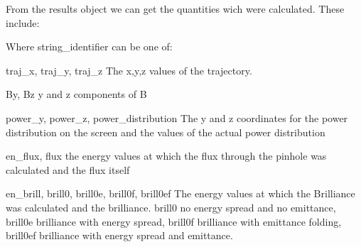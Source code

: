 \documentclass[letterpaper,10pt,english]{sphinxmanual}
\begin{document}
\begin{sphinxVerbatim}[commandchars=\\\{\}]
   
\end{sphinxVerbatim}

\sphinxAtStartPar
From the results object we can get the quantities wich were calculated. These include:

\begin{sphinxVerbatim}[commandchars=\\\{\}]
  
\end{sphinxVerbatim}

\sphinxAtStartPar
Where string\_identifier can be one of:

\begin{DUlineblock}{0em}
\item[] traj\_x, traj\_y, traj\_z \sphinxhyphen{} The x,y,z values of the trajectory.
\end{DUlineblock}

\begin{DUlineblock}{0em}
\item[] By, Bz \sphinxhyphen{} y and z components of B
\end{DUlineblock}

\begin{DUlineblock}{0em}
\item[] power\_y, power\_z, power\_distribution \sphinxhyphen{} The y and z coordinates for the power distribution on the screen and the values of the actual power distribution
\end{DUlineblock}

\begin{DUlineblock}{0em}
\item[] en\_flux, flux \sphinxhyphen{} the energy values at which the flux through the pinhole was calculated and the flux itself
\end{DUlineblock}

\begin{DUlineblock}{0em}
\item[] en\_brill, brill0, brill0e, brill0f, brill0ef \sphinxhyphen{} The energy values at which the Brilliance was calculated and the brilliance. brill0 \sphinxhyphen{} no energy spread and no emittance, brill0e \sphinxhyphen{} brilliance with energy spread, brill0f \sphinxhyphen{} brilliance with emittance folding, brill0ef \sphinxhyphen{} brilliance with energy spread and emittance.
\end{DUlineblock}
\end{document}
